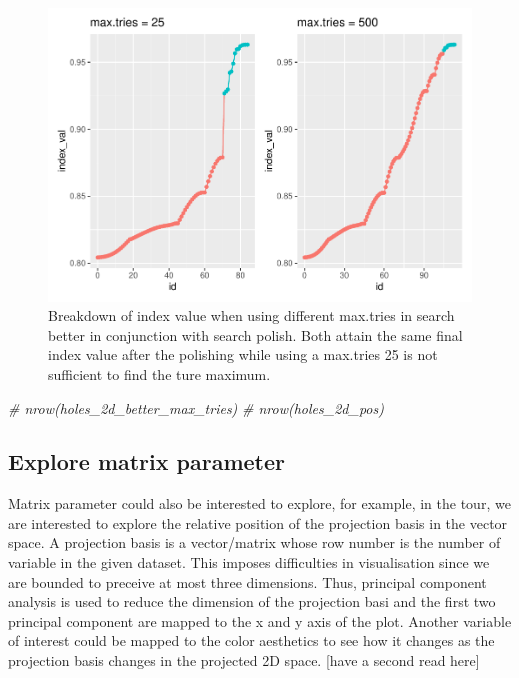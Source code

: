 \documentclass[12pt]{article}
\newenvironment{Shaded}{\begin{snugshade}}{\end{snugshade}}
\newcommand{\CommentTok}[1]{\textcolor[rgb]{0.56,0.35,0.01}{\textit{#1}}}
\begin{document}
\begin{figure}
\centering
\includegraphics{paper_files/figure-latex/polish-1.pdf}
\caption{\label{trace-compare}Breakdown of index value when using
different max.tries in search better in conjunction with search polish.
Both attain the same final index value after the polishing while using a
max.tries 25 is not sufficient to find the ture maximum.}
\end{figure}

\begin{Shaded}
\begin{Highlighting}[]
\CommentTok{# nrow(holes_2d_better_max_tries)}
\CommentTok{# nrow(holes_2d_pos)}
\end{Highlighting}
\end{Shaded}

\hypertarget{explore-matrix-parameter}{%
\subsection{Explore matrix parameter}\label{explore-matrix-parameter}}

Matrix parameter could also be interested to explore, for example, in
the tour, we are interested to explore the relative position of the
projection basis in the vector space. A projection basis is a
vector/matrix whose row number is the number of variable in the given
dataset. This imposes difficulties in visualisation since we are bounded
to preceive at most three dimensions. Thus, principal component analysis
is used to reduce the dimension of the projection basi and the first two
principal component are mapped to the x and y axis of the plot. Another
variable of interest could be mapped to the color aesthetics to see how
it changes as the projection basis changes in the projected 2D space.
{[}have a second read here{]}
\end{document}
